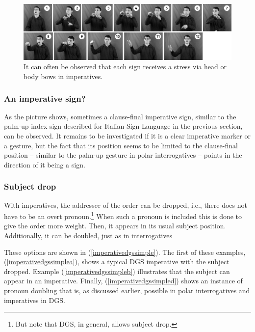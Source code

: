 \begin{figure}[bt]
\centering
	\includegraphics[width=1.0\textwidth]{imperativeheadmovementsw.jpg}
	\caption{It can often be observed that each sign receives a stress via head or body bows in imperatives.}
	\label{fig:headmoveimp}
\end{figure}

\subsubsection{An imperative sign?}
As the picture shows, sometimes a clause-final imperative sign, similar to the palm-up index sign described for Italian Sign Language in the previous section, can be observed. It remains to be investigated if it is a clear imperative marker or a gesture, but the fact that its position seems to be limited to the clause-final position -- similar to the palm-up gesture in polar interrogatives -- points in the direction of it being a sign. 

\subsubsection{Subject drop}
With imperatives, the addressee of the order can be dropped, i.e., there does not have to be an overt pronoun.\footnote{But note that DGS, in general, allows subject drop.} When such a pronoun is included this is done to give the order more weight. Then, it appears in its usual subject position. Additionally, it can be doubled, just as in interrogatives 

These options are shown in (\ref{imperativedgssimple}). The first of these examples, (\ref{imperativedgssimplea}), shows a typical DGS imperative with the subject dropped. Example (\ref{imperativedgssimpleb}) illustrates that the subject can appear in an imperative. Finally, (\ref{imperativedgssimpled}) shows an instance of pronoun doubling that is, as discussed earlier, possible in polar interrogatives and imperatives in DGS.

